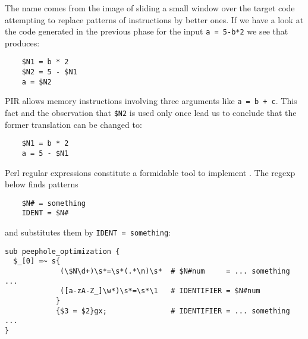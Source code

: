 The name  comes from
the image of sliding a small window 
over the target code attempting to 
replace patterns of instructions 
by better ones. If we have a look at the code 
generated in the previous phase for the input
\verb|a = 5-b*2|
we see that produces:
\begin{verbatim}
    $N1 = b * 2
    $N2 = 5 - $N1
    a = $N2
\end{verbatim}
PIR allows memory instructions involving 
three arguments like \verb|a = b + c|.
This fact and the observation that \verb|$N2| 
is used only once 
lead us to conclude that 
the former translation can be changed to:
\begin{verbatim}
    $N1 = b * 2
    a = 5 - $N1
\end{verbatim}
Perl regular expressions constitute a formidable
tool to implement . The
regexp below finds patterns 
\begin{verbatim}
    $N# = something
    IDENT = $N#
\end{verbatim}
and substitutes them by \verb|IDENT = something|:
\begin{verbatim}
sub peephole_optimization {
  $_[0] =~ s{
             (\$N\d+)\s*=\s*(.*\n)\s*  # $N#num     = ... something ...
             ([a-zA-Z_]\w*)\s*=\s*\1   # IDENTIFIER = $N#num
            } 
            {$3 = $2}gx;               # IDENTIFIER = ... something ...
}
\end{verbatim}

